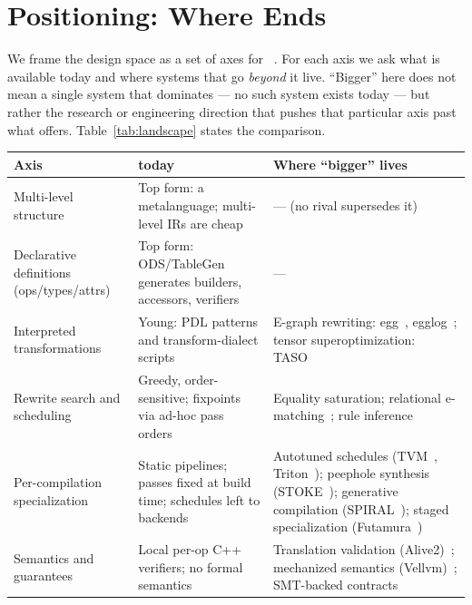 \section{Positioning: Where \mlir{} Ends}
\label{sec:positioning}

We frame the design space as a set of axes for \mlir{}~\cite{lattner2021mlir}. For
each axis we ask what is available today and where systems that go \emph{beyond} it
live. ``Bigger'' here does not mean a single system that dominates \mlir{} --- no such
system exists today --- but rather the research or engineering direction that pushes
that particular axis past what \mlir{} offers. Table~\ref{tab:landscape} states the
comparison.

\begin{table}[t]
  \centering
  \small
  \begin{tabularx}{\textwidth}{@{}>{\raggedright\arraybackslash}p{2.6cm} >{\raggedright\arraybackslash}X >{\raggedright\arraybackslash}X@{}}
  \toprule
  \textbf{Axis} & \textbf{\mlir{} today} & \textbf{Where ``bigger'' lives} \\
  \midrule
  Multi-level structure &
  Top form: a metalanguage; multi-level IRs are cheap &
  --- (no rival supersedes it) \\
  Declarative definitions (ops/types/attrs) &
  Top form: ODS/TableGen generates builders, accessors, verifiers &
  --- \\
  Interpreted transformations &
  Young: PDL patterns and transform-dialect scripts &
  E-graph rewriting: egg~\cite{willsey2021egg},
  egglog~\cite{zhang2023better}; tensor superoptimization:
  TASO~\cite{jia2019taso} \\
  Rewrite search and scheduling &
  Greedy, order-sensitive; fixpoints via ad-hoc pass orders &
  Equality saturation; relational e-matching~\cite{zhang2022relational};
  rule inference~\cite{nandi2021ruler} \\
  Per-compilation specialization &
  Static pipelines; passes fixed at build time; schedules left to backends &
  Autotuned schedules (TVM~\cite{chen2018tvm}, Triton~\cite{tillet2019triton});
  peephole synthesis (STOKE~\cite{schkufza2013stoke}); generative compilation
  (SPIRAL~\cite{puschel2005spiral}); staged specialization
  (Futamura~\cite{futamura1971partial}) \\
  Semantics and guarantees &
  Local per-op C++ verifiers; no formal semantics &
  Translation validation (Alive2)~\cite{lopes2021alive2}; mechanized semantics
  (Vellvm)~\cite{zhao2012vellvm}; SMT-backed contracts \\

\end{tabularx}
\end{table}
